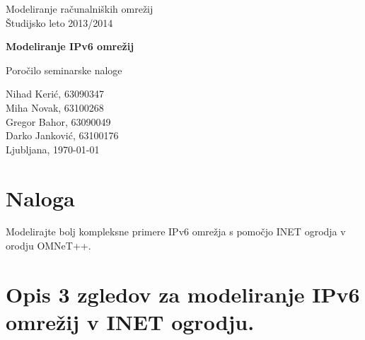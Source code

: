 \documentclass[11pt,a4paper,slovene]{myarticle}
\begin{document}
\label{naslov}
\thispagestyle{empty}

\begin{center}
\begin{Large}
Modeliranje računalniških omrežij\\
Študijsko leto 2013/2014\\
\end{Large}

\vspace*{4cm}
\begin{LARGE}
\textbf{Modeliranje IPv6 omrežij\\}
\end{LARGE}
\vspace*{0.5cm}

\begin{Large}
Poročilo seminarske naloge\\

\vspace*{4cm}

Nihad Kerić, 63090347\\
Miha Novak, 63100268\\
Gregor Bahor, 63090049\\
Darko Janković, 63100176\\

\vspace*{5cm}
Ljubljana, \today
\end{Large}
\end{center}

\pagebreak
\setcounter{page}{1}


\label{Kazalo}
\tableofcontents
\thispagestyle{empty}
\pagebreak

\section{Naloga}
Modelirajte bolj kompleksne primere IPv6 omrežja s pomočjo INET ogrodja v orodju OMNeT++. 

\section{Opis 3 zgledov za modeliranje IPv6 omrežij v INET ogrodju.}
\end{document}

